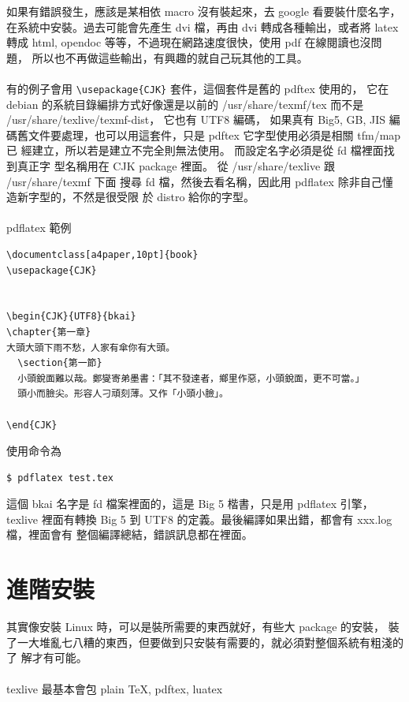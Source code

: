 如果有錯誤發生，應該是某相依 macro 沒有裝起來，去 google 看要裝什麼名字，
在系統中安裝。過去可能會先產生 dvi 檔，再由 dvi 轉成各種輸出，或者將 latex 
轉成 html, opendoc 等等，不過現在網路速度很快，使用 pdf 在線閱讀也沒問題，
所以也不再做這些輸出，有興趣的就自己玩其他的工具。
\\\\
有的例子會用 \verb=\usepackage{CJK}= 套件，這個套件是舊的 pdftex 使用的，
它在 debian 的系統目錄編排方式好像還是以前的 /usr/share/texmf/tex 而不是
/usr/share/texlive/texmf-dist， 它也有 UTF8 編碼， 如果真有 Big5, GB, JIS 編
碼舊文件要處理，也可以用這套件，只是 pdftex 它字型使用必須是相關 tfm/map 已
經建立，所以若是建立不完全則無法使用。 而設定名字必須是從 fd 檔裡面找到真正字
型名稱用在 CJK package 裡面。 從 /usr/share/texlive 跟 /usr/share/texmf 下面
搜尋 fd 檔，然後去看名稱，因此用 pdflatex 除非自己懂造新字型的，不然是很受限
於 distro 給你的字型。
\\\\
pdflatex 範例
\begin{verbatim}
\documentclass[a4paper,10pt]{book}
\usepackage{CJK}


\begin{CJK}{UTF8}{bkai}
\chapter{第一章}
大頭大頭下雨不愁，人家有傘你有大頭。
  \section{第一節}
  小頭銳面難以哉。鄭燮寄弟墨書：「其不發達者，鄉里作惡，小頭銳面，更不可當。」
  頭小而臉尖。形容人刁頑刻薄。又作「小頭小臉」。

\end{CJK}

\end{verbatim}
使用命令為 
\begin{verbatim}
$ pdflatex test.tex
\end{verbatim}
這個 bkai 名字是 fd 檔案裡面的，這是 Big 5 楷書，只是用 pdflatex 引擎，texlive
裡面有轉換 Big 5 到 UTF8 的定義。最後編譯如果出錯，都會有 xxx.log 檔，裡面會有
整個編譯總結，錯誤訊息都在裡面。

\section{進階安裝}
其實像安裝 Linux 時，可以是裝所需要的東西就好，有些大 package 的安裝，
裝了一大堆亂七八糟的東西，但要做到只安裝有需要的，就必須對整個系統有粗淺的了
解才有可能。
\\\\
texlive 最基本會包 plain \TeX, pdftex, luatex
